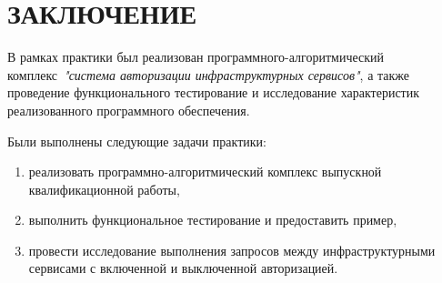 {\centering \chapter*{ЗАКЛЮЧЕНИЕ}}

В рамках практики был реализован программного-алгоритмический комплекс~\textit{"система авторизации инфраструктурных сервисов"}, а также проведение функционального тестирование и исследование характеристик реализованного программного обеспечения.

Были выполнены следующие задачи практики:
\begin{enumerate}
\item реализовать программно-алгоритмический комплекс выпускной квалификационной работы,
\item выполнить функциональное тестирование и предоставить пример,
\item провести исследование выполнения запросов между инфраструктурными сервисами с включенной и выключенной авторизацией.
\end{enumerate}